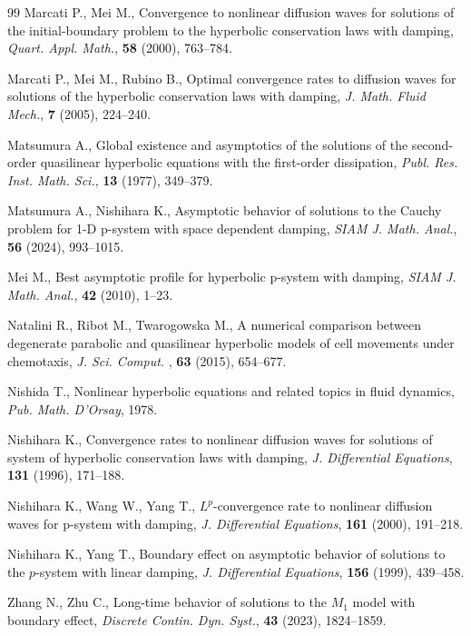 \documentclass[11pt]{article}
\theoremstyle{plain}
\numberwithin{equation}{section}
\begin{document}
{\begin{thebibliography}{99}
Marcati P., Mei M., Convergence to nonlinear diffusion waves for solutions of the initial-boundary problem to the
hyperbolic conservation laws with damping, {\it Quart. Appl. Math.}, {\bf58} (2000), 763--784.

Marcati P., Mei M., Rubino B., Optimal convergence rates to diffusion waves for solutions of the hyperbolic conservation laws with damping, {\it J. Math. Fluid Mech.}, {\bf7} (2005), 224--240.


			Matsumura A., Global existence and asymptotics of the solutions of the second-order quasilinear
			hyperbolic equations with the first-order dissipation, {\it Publ. Res. Inst. Math. Sci.}, {\bf13} (1977), 349--379.
			
Matsumura A., Nishihara K.,  Asymptotic behavior of solutions to the Cauchy problem for 1-D p-system with space dependent damping, {\it SIAM J. Math. Anal.}, {\bf56} (2024), 993--1015.

			Mei M., Best asymptotic profile for hyperbolic p-system with damping, {\it SIAM J. Math. Anal.}, {\bf42} (2010), 1--23.
			
			 Natalini R., Ribot M., Twarogowska M., A numerical comparison between degenerate parabolic and quasilinear
			hyperbolic models of cell movements under chemotaxis, {\it J. Sci. Comput. }, {\bf63} (2015), 654--677.
			
			Nishida T., Nonlinear hyperbolic equations and related topics in fluid dynamics, {\it Pub. Math. D'Orsay}, 1978.
			
			Nishihara K., Convergence rates to nonlinear diffusion waves for solutions of system of hyperbolic conservation laws with
			damping, {\it J. Differential Equations}, {\bf131} (1996), 171--188.
			
			Nishihara K., Wang W., Yang T., $L^p$-convergence rate to nonlinear diffusion waves for
			p-system with damping, {\it J. Differential Equations}, {\bf161} (2000), 191--218.
			
Nishihara K., Yang T., Boundary effect on asymptotic behavior of solutions to the $p$-system with linear damping,
{\it J. Differential Equations}, {\bf 156} (1999), 439--458.

 Zhang N., Zhu C.,  Long-time behavior of solutions to the $M_1$ model with boundary effect, {\it Discrete Contin. Dyn. Syst.}, {\bf 43} (2023), 1824--1859.
			
		\end{thebibliography}
	}
\end{document}
